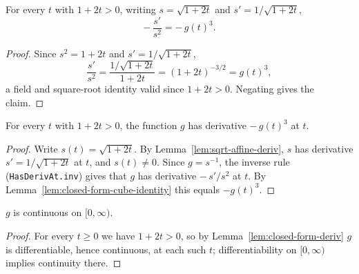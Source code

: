 \begin{lemma}
    \label{lem:closed-form-cube-identity}
    \leanok
    For every $t$ with $1 + 2t > 0$, writing $s = \sqrt{1+2t}$ and
    $s' = 1/\sqrt{1+2t}$,
    \[
        -\,\frac{s'}{s^2} = -\,g(t)^3 .
    \]
\end{lemma}
\begin{proof}
    Since $s^2 = 1 + 2t$ and $s' = 1/\sqrt{1+2t}$,
    \[
        \frac{s'}{s^2} = \frac{1/\sqrt{1+2t}}{1+2t}
                       = (1+2t)^{-3/2} = g(t)^3 ,
    \]
    a field and square-root identity valid since $1 + 2t > 0$. Negating gives the
    claim.
\end{proof}

\begin{lemma}
    \label{lem:closed-form-deriv}
    \leanok
    For every $t$ with $1 + 2t > 0$, the function $g$ has derivative
    $-\,g(t)^3$ at $t$.
\end{lemma}
\begin{proof}
    Write $s(t) = \sqrt{1+2t}$. By Lemma~\ref{lem:sqrt-affine-deriv}, $s$ has
    derivative $s' = 1/\sqrt{1+2t}$ at $t$, and $s(t) \neq 0$. Since
    $g = s^{-1}$, the inverse rule (\texttt{HasDerivAt.inv}) gives that $g$ has
    derivative $-\,s'/s^2$ at $t$. By
    Lemma~\ref{lem:closed-form-cube-identity} this equals $-g(t)^3$.
\end{proof}

\begin{lemma}
    \label{lem:closed-form-continuous}
    \leanok
    $g$ is continuous on $[0,\infty)$.
\end{lemma}
\begin{proof}
    For every $t \ge 0$ we have $1 + 2t > 0$, so by
    Lemma~\ref{lem:closed-form-deriv} $g$ is differentiable, hence continuous, at
    each such $t$; differentiability on $[0,\infty)$ implies continuity there.
\end{proof}

